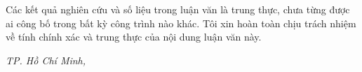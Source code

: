 Các kết quả nghiên cứu và số liệu trong luận văn là trung thực, chưa từng được ai công bố trong bất kỳ công trình nào khác. Tôi xin hoàn toàn chịu trách nhiệm về tính chính xác và trung thực của nội dung luận văn này.

\vspace{2cm}

\begin{flushright}
\textit{TP. Hồ Chí Minh, \submissiondate}\\
\vspace{1cm}
\textbf{\authorname}\\
\end{flushright}

\clearpage
